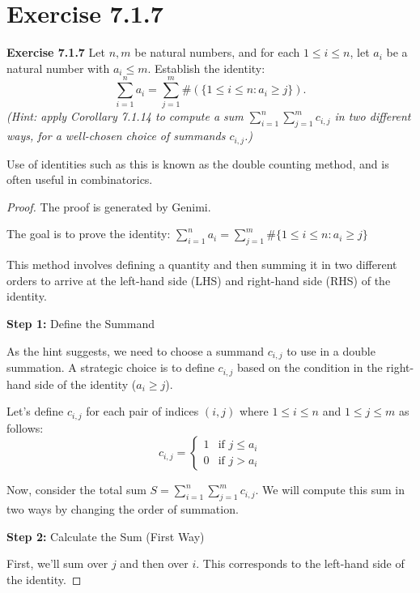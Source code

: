 \documentclass{article}
\begin{document}
\section{Exercise 7.1.7}

\textbf{Exercise 7.1.7}
Let \( n, m \) be natural numbers, and for each \( 1 \leq i \leq n \), let \( a_i \) be a natural number with \( a_i \leq m \). Establish the identity:
\[
    \sum_{i=1}^{n} a_i = \sum_{j=1}^{m} \#\left(\{1 \leq i \leq n : a_i \geq j\}\right).
\]
\textit{(Hint: apply Corollary 7.1.14 to compute a sum \( \sum_{i=1}^{n} \sum_{j=1}^{m} c_{i,j} \) in two different ways, for a well-chosen choice of summands \( c_{i,j} \).)}

Use of identities such as this is known as the double counting method, and is often useful in combinatorics.


\begin{proof}
    The proof is generated by Genimi.

    The goal is to prove the identity:
    \(
    \sum_{i=1}^{n} a_i = \sum_{j=1}^{m} \#\{1 \leq i \leq n : a_i \geq j\}
    \)

    This method involves defining a quantity and then summing it in two different orders to arrive at the left-hand side (LHS) and right-hand side (RHS) of the identity.

    \textbf{Step 1:} Define the Summand

    As the hint suggests, we need to choose a summand \( c_{i,j} \) to use in a double summation. A strategic choice is to define \( c_{i,j} \) based on the condition in the right-hand side of the identity (\( a_i \geq j \)).

    Let's define \( c_{i,j} \) for each pair of indices \( (i, j) \) where \( 1 \leq i \leq n \) and \( 1 \leq j \leq m \) as follows:
    \[
        c_{i,j} = \begin{cases}
            1 & \text{if } j \leq a_i \\
            0 & \text{if } j > a_i
        \end{cases}
    \]

    Now, consider the total sum \( S = \sum_{i=1}^{n} \sum_{j=1}^{m} c_{i,j} \). We will compute this sum in two ways by changing the order of summation.

    \textbf{Step 2:} Calculate the Sum (First Way)

    First, we'll sum over \( j \) and then over \( i \). This corresponds to the left-hand side of the identity.


\end{proof}
\end{document}
